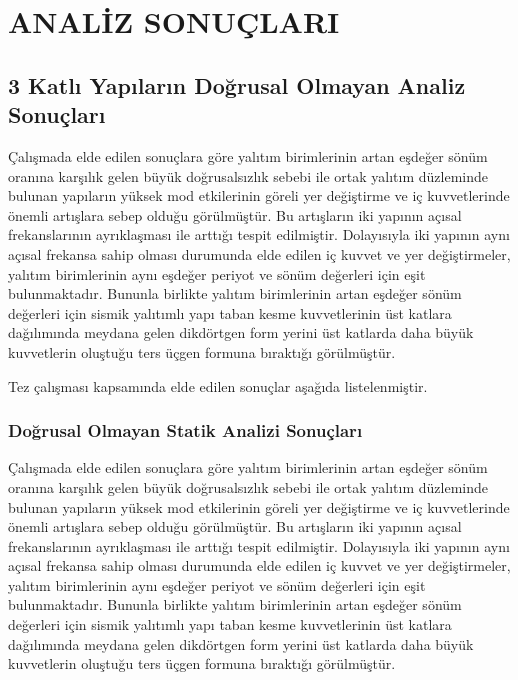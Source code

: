 
\chapter{ANALİZ SONUÇLARI}

\section{3 Katlı Yapıların Doğrusal Olmayan Analiz Sonuçları}

Çalışmada elde edilen sonuçlara göre yalıtım birimlerinin artan eşdeğer
sönüm oranına karşılık gelen büyük doğrusalsızlık sebebi ile ortak
yalıtım düzleminde bulunan yapıların yüksek mod etkilerinin göreli
yer değiştirme ve iç kuvvetlerinde önemli artışlara sebep olduğu görülmüştür.
Bu artışların iki yapının açısal frekanslarının ayrıklaşması ile arttığı
tespit edilmiştir. Dolayısıyla iki yapının aynı açısal frekansa sahip
olması durumunda elde edilen iç kuvvet ve yer değiştirmeler, yalıtım
birimlerinin aynı eşdeğer periyot ve sönüm değerleri için eşit bulunmaktadır.
Bununla birlikte yalıtım birimlerinin artan eşdeğer sönüm değerleri
için sismik yalıtımlı yapı taban kesme kuvvetlerinin üst katlara dağılımında
meydana gelen dikdörtgen form yerini üst katlarda daha büyük kuvvetlerin
oluştuğu ters üçgen formuna bıraktığı görülmüştür.

Tez çalışması kapsamında elde edilen sonuçlar aşağıda listelenmiştir. 

\subsection{Doğrusal Olmayan Statik Analizi Sonuçları}

Çalışmada elde edilen sonuçlara göre yalıtım birimlerinin artan eşdeğer
sönüm oranına karşılık gelen büyük doğrusalsızlık sebebi ile ortak
yalıtım düzleminde bulunan yapıların yüksek mod etkilerinin göreli
yer değiştirme ve iç kuvvetlerinde önemli artışlara sebep olduğu görülmüştür.
Bu artışların iki yapının açısal frekanslarının ayrıklaşması ile arttığı
tespit edilmiştir. Dolayısıyla iki yapının aynı açısal frekansa sahip
olması durumunda elde edilen iç kuvvet ve yer değiştirmeler, yalıtım
birimlerinin aynı eşdeğer periyot ve sönüm değerleri için eşit bulunmaktadır.
Bununla birlikte yalıtım birimlerinin artan eşdeğer sönüm değerleri
için sismik yalıtımlı yapı taban kesme kuvvetlerinin üst katlara dağılımında
meydana gelen dikdörtgen form yerini üst katlarda daha büyük kuvvetlerin
oluştuğu ters üçgen formuna bıraktığı görülmüştür.


